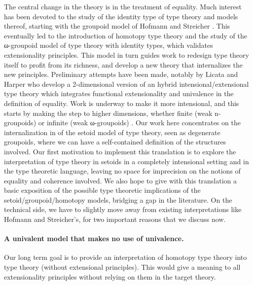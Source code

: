 The central change in the theory is in the treatment of equality.  Much
interest has been devoted to the study of the identity type of type
theory and models thereof, starting with the groupoid model of Hofmann
and Streicher \cite{groupoid-interp}. This eventually led to the
introduction of homotopy type theory and the study of the ω-groupoid
model of type theory with identity types, which validates extensionality
principles.
This model in turn
guides work to redesign type theory itself to profit from its
richness, and develop a new theory that internalizes the new
principles. Preliminary attempts have been made, notably by Licata and
Harper \cite{DBLP:conf/popl/LicataH12} who develop a 2-dimensional
version of an hybrid intensional/extensional type theory which
integrates functional extensionality and univalence in the definition
of equality. Work is underway to make it more intensional, and this
starts by making the step to higher dimensions, whether finite (weak
n-groupoids) or infinite (weak ω-groupoids)
\cite{DBLP:conf/csl/AltenkirchR12}. %
%
Our work here concentrates on the internalization in \Coq of the setoid
model of type theory, seen as degenerate groupoids, where we can have a
self-contained definition of the structures involved. 
%
Our first motivation to implement this translation is to explore the
interpretation of type theory in setoids in a completely intensional
setting and in the type theoretic language, leaving no space for
imprecision on the notions of equality and coherence involved.  We also
hope to give with this translation a basic exposition of the possible
type theoretic implications of the setoid/groupoid/homotopy models,
bridging a gap in the literature.
%
On the technical side, we have to slightly move away from existing
interpretations like Hofmann and Streicher's, for two important reasons
that we discuss now.


\paragraph{\bf A univalent model that makes no use of univalence.}


Our long term goal is to provide an interpretation of homotopy type
theory into type theory (without extensional principles).
%
This would give a meaning to all extensionality
principles without relying on them in the target theory.


